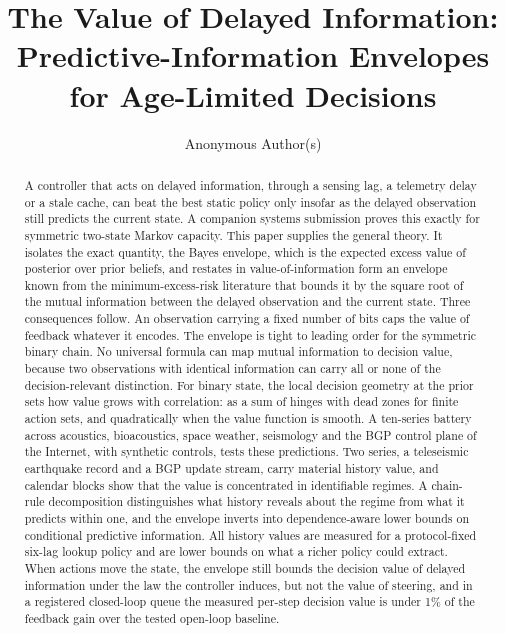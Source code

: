 \documentclass[acmsmall,screen,review,anonymous]{acmart}
\begin{document}
\title{The Value of Delayed Information: Predictive-Information Envelopes for Age-Limited Decisions}
\author{Anonymous Author(s)}
\begin{abstract}
A controller that acts on delayed information, through a sensing lag, a
telemetry delay or a stale cache, can beat the best static policy only
insofar as the delayed observation still predicts the current state. A
companion systems submission \cite{infocom} proves this exactly for
symmetric two-state Markov capacity. This paper supplies the general
theory. It isolates the exact quantity, the Bayes envelope, which is the
expected excess value of posterior over prior beliefs, and restates in
value-of-information form an envelope known from the minimum-excess-risk
literature that bounds it by the square root of the mutual information
between the delayed observation and the current state. Three consequences
follow. An observation carrying a fixed number of bits caps the value of
feedback whatever it encodes. The envelope is tight to leading order for
the symmetric binary chain. No universal formula can map mutual
information to decision value, because two observations with identical
information can carry all or none of the decision-relevant distinction.
For binary state, the local decision geometry at the prior sets how value
grows with correlation: as a sum of hinges with dead zones for finite
action sets, and quadratically when the value function is smooth. A
ten-series battery across acoustics, bioacoustics, space weather,
seismology and the BGP control plane of the Internet, with synthetic
controls, tests these predictions. Two series, a teleseismic earthquake
record and a BGP update stream, carry material history value, and
calendar blocks show that the value is concentrated in identifiable regimes. A
chain-rule decomposition distinguishes what history reveals about the regime
from what it predicts within one, and the envelope inverts into
dependence-aware lower bounds on conditional predictive information. All
history values are measured for a protocol-fixed six-lag lookup policy and are
lower bounds on what a richer policy could extract. When actions move the
state, the envelope still bounds the decision value of delayed
information under the law the controller induces, but not the value of
steering, and in a registered closed-loop queue the measured per-step
decision value is under 1\% of the feedback gain over the tested open-loop
baseline.
\end{abstract}
\maketitle
\end{document}
